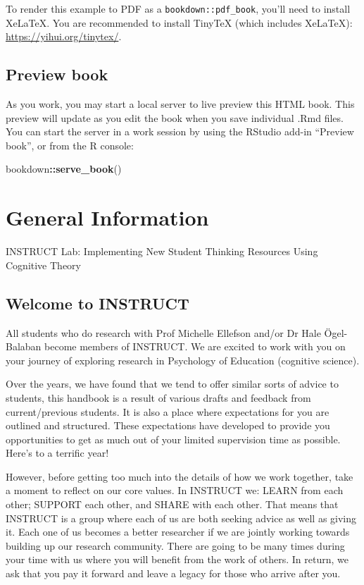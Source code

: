 \documentclass[
]{book}
\newenvironment{Shaded}{\begin{snugshade}}{\end{snugshade}}
\newcommand{\FunctionTok}[1]{\textcolor[rgb]{0.13,0.29,0.53}{\textbf{#1}}}
\newcommand{\NormalTok}[1]{#1}
\newcommand{\SpecialCharTok}[1]{\textcolor[rgb]{0.81,0.36,0.00}{\textbf{#1}}}
\theoremstyle{definition}
\theoremstyle{definition}
\theoremstyle{definition}
\theoremstyle{definition}
\theoremstyle{remark}
\begin{document}
To render this example to PDF as a \texttt{bookdown::pdf\_book}, you'll need to install XeLaTeX. You are recommended to install TinyTeX (which includes XeLaTeX): \url{https://yihui.org/tinytex/}.

\section{Preview book}\label{preview-book}

As you work, you may start a local server to live preview this HTML book. This preview will update as you edit the book when you save individual .Rmd files. You can start the server in a work session by using the RStudio add-in ``Preview book'', or from the R console:

\begin{Shaded}
\begin{Highlighting}[]
\NormalTok{bookdown}\SpecialCharTok{::}\FunctionTok{serve\_book}\NormalTok{()}
\end{Highlighting}
\end{Shaded}

\chapter{General Information}\label{general-information}

INSTRUCT Lab: Implementing New Student Thinking Resources Using Cognitive Theory

\section{Welcome to INSTRUCT}\label{welcome-to-instruct}

All students who do research with Prof Michelle Ellefson and/or Dr Hale Ögel-Balaban become members of INSTRUCT. We are excited to work with you on your journey of exploring research in Psychology of Education (cognitive science).

Over the years, we have found that we tend to offer similar sorts of advice to students, this handbook is a result of various drafts and feedback from current/previous students. It is also a place where expectations for you are outlined and structured. These expectations have developed to provide you opportunities to get as much out of your limited supervision time as possible. Here's to a terrific year!

However, before getting too much into the details of how we work together, take a moment to reflect on our core values. In INSTRUCT we: LEARN from each other; SUPPORT each other, and SHARE with each other. That means that INSTRUCT is a group where each of us are both seeking advice as well as giving it. Each one of us becomes a better researcher if we are jointly working towards building up our research community. There are going to be many times during your time with us where you will benefit from the work of others. In return, we ask that you pay it forward and leave a legacy for those who arrive after you.
\end{document}

